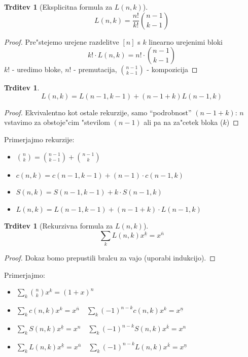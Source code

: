 \documentclass[a4paper,12pt]{article}
\theoremstyle{definition}
\newtheorem{claim}[counter]{Trditev}
\theoremstyle{remark}
\begin{document}
\begin{claim}[Eksplicitna formula za $L(n, k)$]
    \[L(n,k) = \frac{n!}{k!} \binom{n-1}{k-1}\]
\end{claim}
\begin{proof}
    Pre"stejemo urejene razdelitve $[n]$ s $k$ linearno urejenimi bloki
    \[ k! \cdot L(n,k) = n! \cdot \binom{n-1}{k-1} \]
    $k!$ - uredimo bloke, $n!$ - premutacija, $\binom{n-1}{k-1}$ - kompozicija
\end{proof}

\begin{claim}
    \[L(n,k) = L(n-1, k-1) + (n-1+k) L(n-1, k)\]
\end{claim}
\begin{proof}
    Ekvivalentno kot ostale rekurzije, samo ``podrobnost'' $(n-1+k)$: $n$ vstavimo za obstoje"cim "stevilom $(n-1)$ ali pa na za"cetek bloka ($k$)
\end{proof}

Primerjajmo rekurzije:
\begin{itemize}
    \item $\binom{n}{k} = \binom{n-1}{k-1} + \binom{n-1}{k}$
    \item $c(n,k) = c(n-1, k-1) + (n-1) \cdot c(n-1, k)$
    \item $S(n,k) = S(n-1, k-1) + k\cdot S(n-1, k)$
    \item $L(n,k) = L(n-1, k-1) + (n-1+k)\cdot L(n-1, k)$
\end{itemize}

\begin{claim}[Rekurzivna formula za $L(n, k)$]
    \[ \sum_k L(n,k)x^{\underline{k}} = x^{\overline{n}}\]
\end{claim}
\begin{proof}
    Dokaz bomo prepustili bralcu za vajo (uporabi indukcijo).
\end{proof}

Primerjajmo:
\begin{itemize}
    \item $\sum_k \binom{n}{k}x^k = (1+x)^n$
    \item $\sum_k c(n,k)x^k = x^{\overline{n}} \quad \sum_k (-1)^{n-k}c(n,k)x^k = x^{\underline{n}}$
    \item $\sum_k S(n,k)x^{\underline{k}} = x^n \quad \sum_k (-1)^{n-k}S(n,k)x^{\overline{k}} = x^n$
    \item $\sum_k L(n,k)x^{\underline{k}} = x^{\overline{{n}}} \quad \sum_k (-1)^{n-k}L(n,k)x^{\overline{{k}}} = x^{\underline{n}}$
\end{itemize}
\end{document}

